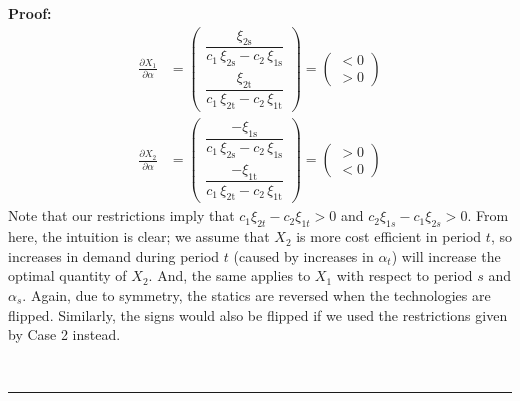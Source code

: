 \documentclass[12pt,a4paper]{extarticle}
\newenvironment{proof}[1][Proof]{\noindent\textbf{#1:} }{\ \rule{0.5em}{0.5em}}
\begin{document}
\begin{proof}
\begin{align*}
\frac{\partial X_1}{\partial \alpha} &= 
\begin{pmatrix}
\dfrac{\xi _{\mathrm{2s}}}{c_{1}\,\xi _{\mathrm{2s}}-c_{2}\,\xi _{\mathrm{1s}}} \\
\dfrac{\xi _{\mathrm{2t}}}{c_{1}\,\xi _{\mathrm{2t}}-c_{2}\,\xi _{\mathrm{1t}}}
\end{pmatrix}
=
\begin{pmatrix}
< 0 \\
> 0 
\end{pmatrix} \\
\frac{\partial X_2}{\partial \alpha} &= 
\begin{pmatrix}
\dfrac{-\xi _{\mathrm{1s}}}{c_{1}\,\xi _{\mathrm{2s}}-c_{2}\,\xi _{\mathrm{1s}}} \\
\dfrac{-\xi _{\mathrm{1t}}}{c_{1}\,\xi _{\mathrm{2t}}-c_{2}\,\xi _{\mathrm{1t}}}
\end{pmatrix}
=
\begin{pmatrix}
> 0 \\
< 0 
\end{pmatrix}
\end{align*}
Note that our restrictions imply that $c_1 \xi_{2t} - c_2 \xi_{1t} > 0$ and $c_2 \xi_{1s} - c_1 \xi_{2s} > 0$. From here, the intuition is clear; we assume that $X_2$ is more cost efficient in period $t$, so increases in demand during period $t$ (caused by increases in $\alpha_t$) will increase the optimal quantity of $X_2$. And, the same applies to $X_1$ with respect to period $s$ and $\alpha_s$. Again, due to symmetry, the statics are reversed when the technologies are flipped. Similarly, the signs would also be flipped if we used the restrictions given by Case 2 instead. 


\end{proof}
\end{document}
